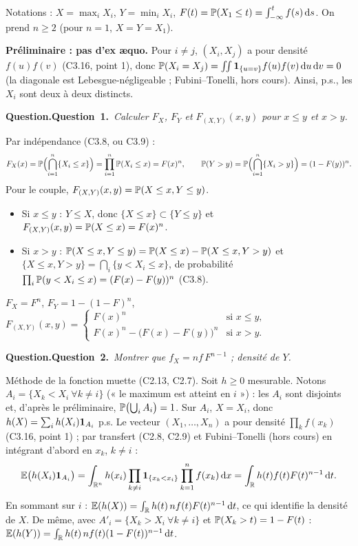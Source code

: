\documentclass[11pt,a4paper]{article}
\newcommand{\question}[2]{\par\medskip\noindent\textbf{\ifx\relax#1\relax Question.\else Question~#1.\fi}~\textit{#2}\par\smallskip}
\begin{document}
\begin{exo}
Notations : $X=\max_iX_i$, $Y=\min_iX_i$, $F(t)=\mathbb{P}(X_1\le t)=\int_{-\infty}^tf(s)\,\mathrm{d} s$. On prend $n\ge2$ (pour $n=1$, $X=Y=X_1$).

\textbf{Préliminaire : pas d'ex \ae quo.} Pour $i\ne j$, $(X_i,X_j)$ a pour densité $f(u)f(v)$ (C3.16, point 1), donc
$\mathbb{P}(X_i=X_j)=\iint\mathbf{1}_{\{u=v\}}f(u)f(v)\,\mathrm{d} u\,\mathrm{d} v=0$ (la diagonale est Lebesgue-négligeable ; Fubini--Tonelli, hors cours).
Ainsi, p.s., les $X_i$ sont deux à deux distincts.

\question{1}{Calculer $F_X$, $F_Y$ et $F_{(X,Y)}(x,y)$ pour $x\le y$ et $x>y$.}

Par indépendance (C3.8, ou C3.9) :
\[F_X(x)=\mathbb{P}\Bigl(\bigcap_{i=1}^n\{X_i\le x\}\Bigr)=\prod_{i=1}^n\mathbb{P}(X_i\le x)=F(x)^n,\qquad
\mathbb{P}(Y>y)=\mathbb{P}\Bigl(\bigcap_{i=1}^n\{X_i>y\}\Bigr)=(1-F(y))^n .\]
Pour le couple, $F_{(X,Y)}(x,y)=\mathbb{P}(X\le x,Y\le y)$.
\begin{itemize}
  \item Si $x\le y$ : $Y\le X$, donc $\{X\le x\}\subset\{Y\le y\}$ et $F_{(X,Y)}(x,y)=\mathbb{P}(X\le x)=F(x)^n$.
  \item Si $x>y$ : $\mathbb{P}(X\le x,Y\le y)=\mathbb{P}(X\le x)-\mathbb{P}(X\le x,Y>y)$ et
  $\{X\le x,Y>y\}=\bigcap_i\{y<X_i\le x\}$, de probabilité $\prod_i\mathbb{P}(y<X_i\le x)=(F(x)-F(y))^n$ (C3.8).
\end{itemize}

\begin{resultat}
$F_X=F^n$, \quad $F_Y=1-(1-F)^n$, \quad
$F_{(X,Y)}(x,y)=\begin{cases}F(x)^n&\text{si }x\le y,\\F(x)^n-\bigl(F(x)-F(y)\bigr)^n&\text{si }x>y.\end{cases}$
\end{resultat}

\question{2}{Montrer que $f_X=nf\,F^{n-1}$ ; densité de $Y$.}

Méthode de la fonction muette (C2.13, C2.7). Soit $h\ge0$ mesurable. Notons $A_i=\{X_k<X_i\ \forall k\ne i\}$ (« le maximum est atteint
en $i$ ») : les $A_i$ sont disjoints et, d'après le préliminaire, $\mathbb{P}\bigl(\bigcup_iA_i\bigr)=1$. Sur $A_i$, $X=X_i$, donc
$h(X)=\sum_ih(X_i)\mathbf{1}_{A_i}$ p.s. Le vecteur $(X_1,\dots,X_n)$ a pour densité $\prod_kf(x_k)$ (C3.16, point 1) ; par transfert (C2.8,
C2.9) et Fubini--Tonelli (hors cours) en intégrant d'abord en $x_k$, $k\ne i$ :
\[\mathbb{E}\bigl(h(X_i)\mathbf{1}_{A_i}\bigr)=\int_{\mathbb{R}^n}h(x_i)\prod_{k\ne i}\mathbf{1}_{\{x_k<x_i\}}\prod_{k=1}^nf(x_k)\,\mathrm{d} x
=\int_{\mathbb{R}} h(t)f(t)F(t)^{n-1}\,\mathrm{d} t .\]
En sommant sur $i$ : $\mathbb{E}(h(X))=\int_{\mathbb{R}} h(t)\,nf(t)F(t)^{n-1}\,\mathrm{d} t$, ce qui identifie la densité de $X$. De même, avec
$A'_i=\{X_k>X_i\ \forall k\ne i\}$ et $\mathbb{P}(X_k>t)=1-F(t)$ : $\mathbb{E}(h(Y))=\int_{\mathbb{R}} h(t)\,nf(t)(1-F(t))^{n-1}\,\mathrm{d} t$.


\end{exo}
\end{document}
